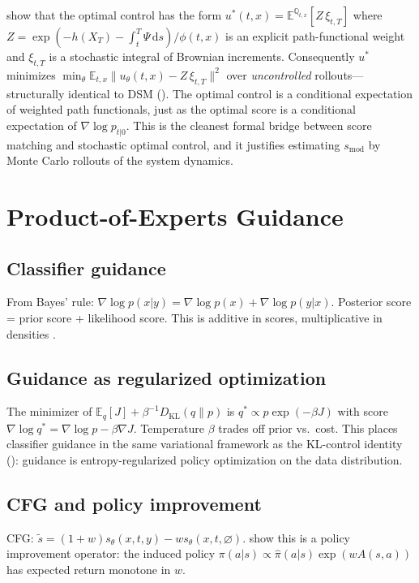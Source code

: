 \documentclass[11pt,letterpaper]{article}
\theoremstyle{plain}
\theoremstyle{definition}
\theoremstyle{remark}
\newcommand{\E}{\mathbb{E}}
\newcommand{\dd}{\mathrm{d}}
\newcommand{\KL}{D_{\mathrm{KL}}}
\newcommand{\grad}{\nabla}
\newcommand{\norm}[1]{\lVert #1\rVert}
\newcommand{\smodel}{s_{\mathrm{mod}}}
\begin{document}
\begin{advancedmath}
\citet{domingoenrich2024socm} show that the optimal control has the
form $u^*(t,x)=\E^{\mathbb{Q}_{t,x}}[Z\,\xi_{t,T}]$ where
$Z=\exp(-h(X_T)-\int_t^T\Psi\,\dd s)/\phi(t,x)$ is an explicit
path-functional weight and $\xi_{t,T}$ is a stochastic integral of
Brownian increments. Consequently $u^*$ minimizes
$\min_\theta\E_{t,x}\norm{u_\theta(t,x)-Z\,\xi_{t,T}}^2$
over \emph{uncontrolled} rollouts---structurally identical to DSM
().
The optimal control is a conditional expectation of weighted path
functionals, just as the optimal score is a conditional expectation of
$\grad\log p_{t|0}$. This is the cleanest formal bridge between score
matching and stochastic optimal control, and it justifies estimating
$\smodel$ by Monte Carlo rollouts of the system dynamics.
\end{advancedmath}

\section{Product-of-Experts Guidance}\label{sec:poe}

\subsection{Classifier guidance}

From Bayes' rule:
$\grad\log p(x|y)=\grad\log p(x)+\grad\log p(y|x)$.
Posterior score = prior score + likelihood score. This is additive in
scores, multiplicative in densities \citep{dhariwal2021diffusion}.

\begin{advancedmath}
\subsection{Guidance as regularized optimization}

The minimizer of $\E_q[J]+\beta^{-1}\KL(q\|p)$ is
$q^*\propto p\exp(-\beta J)$ with score
$\grad\log q^*=\grad\log p-\beta\grad J$.
Temperature $\beta$ trades off prior vs.\ cost.  This places
classifier guidance in the same variational framework as the
KL-control identity (): guidance is entropy-regularized
policy optimization on the data distribution.

\subsection{CFG and policy improvement}

CFG: $\tilde s=(1+w)s_\theta(x,t,y)-ws_\theta(x,t,\varnothing)$.
\citet{cfgrl} show this is a policy improvement operator: the induced
policy $\pi(a|s)\propto\hat\pi(a|s)\exp(wA(s,a))$ has expected return
monotone in $w$.
\end{advancedmath}
\end{document}
